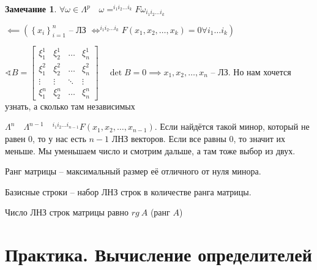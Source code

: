 \documentclass{book}
\theoremstyle{definition}
\newtheorem*{note}{Замечание}
\begin{document}
    \begin{note}
        $\forall \omega\in\Lambda^p\quad \omega = ^{i_1i_2\ldots i_k}F\omega_{i_1i_2\ldots i_k}$

        $\impliedby \left( \left\{ x_i \right\} _{i=1}^n \text{ -- ЛЗ } \iff ^{i_1i_2\ldots i_k}F\left( x_1, x_2, \ldots, x_k \right) =0 \forall i_1 \ldots i_k \right) $
    \end{note}

    $\sphericalangle B =  \begin{bmatrix} \xi_1^1 & \xi_2^1 & \ldots & \xi_n^1 \\ \xi_1^2 & \xi_2^2 & \ldots &\xi_n^2\\ \vdots & \vdots &\ddots & \vdots\\ \xi_1^n & \xi_2^n & \ldots & \xi_n^n  \end{bmatrix} \quad \det B = 0 \implies  x_1,x_2, \ldots, x_n$ -- ЛЗ. Но нам хочется узнать, а сколько там независимых

    $\Lambda^n\quad \Lambda^{n-1}\quad ^{i_1 i_2 \ldots i_{n-1}}F\left( x_1, x_2, \ldots, x_{n-1} \right) $. Если найдётся такой минор, который не равен 0, то у нас есть $n-1$ ЛНЗ векторов. Если все равны 0, то значит их меньше. Мы уменьшаем число и смотрим дальше, а там тоже выбор из двух.

    \begin{definition}
        Ранг матрицы -- максимальный размер её отличного от нуля минора.
    \end{definition}

    \begin{definition}
        Базисные строки -- набор ЛНЗ строк в количестве ранга матрицы.
    \end{definition}

    \begin{theorem}
        Число ЛНЗ строк матрицы равно $rg~A$ (ранг  $A$)
    \end{theorem}


\section{Практика. Вычисление определителей}
\end{document}
